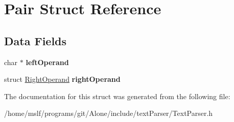 \hypertarget{struct_pair}{}\section{Pair Struct Reference}
\label{struct_pair}
\subsection*{Data Fields}
\begin{DoxyCompactItemize}
\item 
\hypertarget{struct_pair_a7025d7d52caceaac4ee18d250dc091ed}{}\label{struct_pair_a7025d7d52caceaac4ee18d250dc091ed} 
char $\ast$ {\bfseries left\+Operand}
\item 
\hypertarget{struct_pair_a53499f5efcd7f396b62199c5be2a15d3}{}\label{struct_pair_a53499f5efcd7f396b62199c5be2a15d3} 
struct \hyperlink{struct_right_operand}{Right\+Operand} {\bfseries right\+Operand}
\end{DoxyCompactItemize}


The documentation for this struct was generated from the following file\+:\begin{DoxyCompactItemize}
\item 
/home/mslf/programs/git/\+Alone/include/text\+Parser/Text\+Parser.\+h\end{DoxyCompactItemize}
